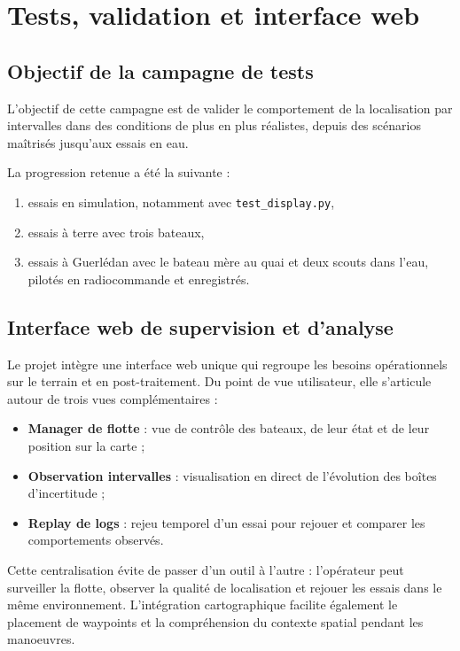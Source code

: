 \section{Tests, validation et interface web}

\subsection{Objectif de la campagne de tests}

L'objectif de cette campagne est de valider le comportement de la localisation par intervalles dans des conditions de plus en plus réalistes, depuis des scénarios maîtrisés jusqu'aux essais en eau.

La progression retenue a été la suivante :
\begin{enumerate}
	\item essais en simulation, notamment avec \texttt{test\_display.py},
	\item essais à terre avec trois bateaux,
	\item essais à Guerlédan avec le bateau mère au quai et deux scouts dans l'eau, pilotés en radiocommande et enregistrés.
\end{enumerate}

\subsection{Interface web de supervision et d'analyse}

Le projet intègre une interface web unique qui regroupe les besoins opérationnels sur le terrain et en post-traitement. Du point de vue utilisateur, elle s'articule autour de trois vues complémentaires :
\begin{itemize}
	\item \textbf{Manager de flotte} : vue de contrôle des bateaux, de leur état et de leur position sur la carte ;
	\item \textbf{Observation intervalles} : visualisation en direct de l'évolution des boîtes d'incertitude ;
	\item \textbf{Replay de logs} : rejeu temporel d'un essai pour rejouer et comparer les comportements observés.
\end{itemize}

Cette centralisation évite de passer d'un outil à l'autre : l'opérateur peut surveiller la flotte, observer la qualité de localisation et rejouer les essais dans le même environnement. L'intégration cartographique facilite également le placement de waypoints et la compréhension du contexte spatial pendant les manoeuvres.

